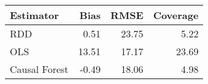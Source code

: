 \begin{table}[ht]
\centering
\begin{tabular}{lrrr}
  \hline
Estimator & Bias & RMSE & Coverage \\ 
  \hline
RDD & 0.51 & 23.75 & 5.22 \\ 
  OLS & 13.51 & 17.17 & 23.69 \\ 
  Causal Forest & -0.49 & 18.06 & 4.98 \\ 
   \hline
\end{tabular}
\caption{} 
\end{table}
